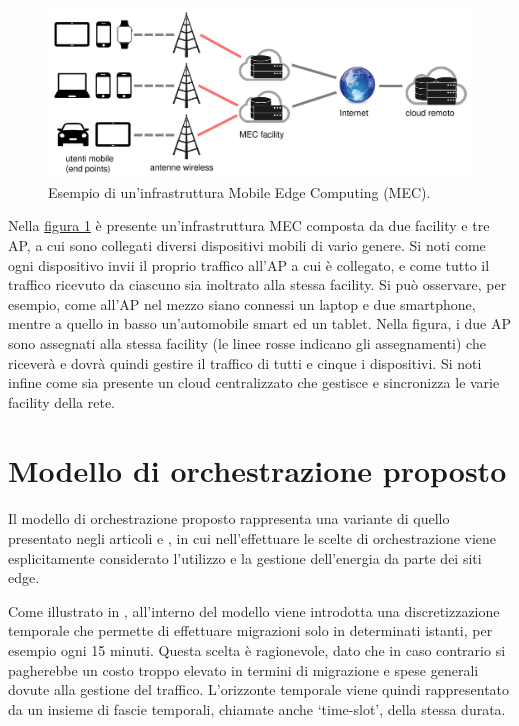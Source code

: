 \begin{figure}[t]
    \centering
    \includegraphics[width = 150mm]{img/esempio-infrastruttura-mec.pdf}
    \caption{Esempio di un'infrastruttura Mobile Edge Computing (MEC).}
    \label{fig:architettura-mec}
\end{figure}

Nella \hyperref[fig:architettura-mec]{figura 1} è presente un'infrastruttura MEC composta da due facility e tre AP, a cui sono collegati diversi dispositivi mobili di vario genere. Si noti come ogni dispositivo invii il proprio traffico all'AP a cui è collegato, e come tutto il traffico ricevuto da ciascuno sia inoltrato alla stessa facility. Si può osservare, per esempio, come all'AP nel mezzo siano connessi un laptop e due smartphone, mentre a quello in basso un'automobile smart ed un tablet. Nella figura, i due AP sono assegnati alla stessa facility (le linee rosse indicano gli assegnamenti) che riceverà e dovrà quindi gestire il traffico di tutti e cinque i dispositivi. Si noti infine come sia presente un cloud centralizzato che gestisce e sincronizza le varie facility della rete.


%
%
\section{Modello di orchestrazione proposto}
\label{sec:modello-di-orchestrazione-proposto}

Il modello di orchestrazione proposto rappresenta una variante di quello presentato negli articoli \cite{assignment-patterns} e \cite{analytics-mec}, in cui nell'effettuare le scelte di orchestrazione viene esplicitamente considerato l'utilizzo e la gestione dell'energia da parte dei siti edge.

Come illustrato in \cite{analytics-mec}, all'interno del modello viene introdotta una discretizzazione temporale che permette di effettuare migrazioni solo in determinati istanti, per esempio ogni 15 minuti. Questa scelta è ragionevole, dato che in caso contrario si pagherebbe un costo troppo elevato in termini di migrazione e spese generali dovute alla gestione del traffico. L'orizzonte temporale viene quindi rappresentato da un insieme di fascie temporali, chiamate anche `time-slot', della stessa durata.


